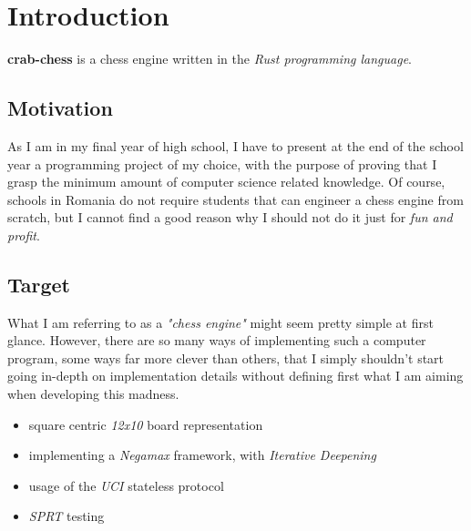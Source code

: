 
\section{Introduction}

\textbf{crab-chess} is a chess engine written in the \textit{Rust programming language}.

\subsection{Motivation}
As I am in my final year of high school, I have to present at the end of the school year a programming project of my choice, with the purpose of proving that I grasp the minimum amount of computer science related knowledge. Of course, schools in Romania do not require students that can engineer a chess engine from scratch, but I cannot find a good reason why I should not do it just for \textit{fun and profit}.

\subsection{Target}
What I am referring to as a \textit{"chess engine"} might seem pretty simple at first glance. However, there are so many ways of implementing such a computer program, some ways far more clever than others, that I simply shouldn't start going in-depth on implementation details without defining first what I am aiming when developing this madness.

\begin{itemize}
    \item square centric \textit{12x10} board representation
    \item implementing a \textit{Negamax} framework, with \textit{Iterative Deepening}
    \item usage of the \textit{UCI} stateless protocol
    \item \textit{SPRT} testing
\end{itemize}